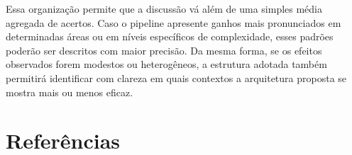 \documentclass[a4paper,10pt,twocolumn]{article}
\begin{document}
Essa organização permite que a discussão vá além de uma simples média agregada de acertos. Caso o pipeline apresente ganhos mais pronunciados em determinadas áreas ou em níveis específicos de complexidade, esses padrões poderão ser descritos com maior precisão. Da mesma forma, se os efeitos observados forem modestos ou heterogêneos, a estrutura adotada também permitirá identificar com clareza em quais contextos a arquitetura proposta se mostra mais ou menos eficaz.

\FloatBarrier
\section{Referências}

\printbibliography[heading=none]
\end{document}
